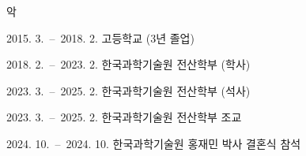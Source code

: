 \documentclass[master,english,draft]{kaist-ucs} %
\begin{document}










\acknowledgment[4]
악

\curriculumvitae[4]

  \begin{personaldata}
  \end{personaldata}

  \begin{education}
    \item[2015. 3.\ --\ 2018. 2.] 고등학교 (3년 졸업)
    \item[2018. 2.\ --\ 2023. 2.] 한국과학기술원 전산학부 (학사)
    \item[2023. 3.\ --\ 2025. 2.] 한국과학기술원 전산학부 (석사)
  \end{education}

  \begin{career}
    \item[2023. 3.\ --\ 2025. 2.] 한국과학기술원 전산학부 조교
    \item[2024. 10.\ --\ 2024. 10.] 한국과학기술원 홍재민 박사 결혼식 참석
  \end{career}
\end{document}
